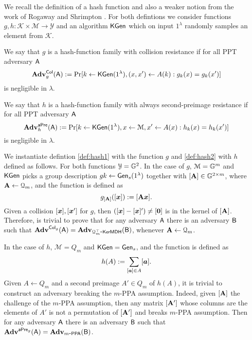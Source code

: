 We recall the definition of a hash function and also a weaker notion from the work of Rogaway and Shrimpton \cite{FSE:RogShr04}. For both defintions we consider functions $g,h:\mathcal{K}\times\mathcal{M}\to\mathcal{Y}$ and an algorithm $\mathsf{KGen}$ which on input $1^\lambda$ randomly samples an element from $\mathcal{K}$.

\begin{definition}\label{def:hash1}
 We say that $g$ is a hash-function family with collision resistance if for all PPT adversary $\mathsf{A}$
$$
\mathbf{Adv}_g^{\mathsf{Col}}(\mathsf{A}) := \Pr[k\gets\mathsf{KGen}(1^\lambda), (x,x')\gets A(k):g_k(x)=g_k(x')]
$$ 
is negligible in $\lambda$.
\end{definition}

\begin{definition}\label{def:hash2}
 We say that $h$ is a hash-function family with always second-preimage resistance if for all PPT adversary $\mathsf{A}$
$$
\mathbf{Adv}_h^{\mathsf{aPre}}(\mathsf{A}) := \Pr[k\gets\mathsf{KGen}(1^\lambda), x\gets\mathcal{M}, x'\gets A(x):h_k(x)=h_k(x')]
$$ 
is negligible in $\lambda$.
\end{definition}

We instantiate defintion \ref{def:hash1} with the function $g$ and \ref{def:hash2}  with $h$ defined as follows. For both functions $\mathcal{Y}=\mathbb{G}^2$. In the case of $g$, $\mathcal{M}=\mathbb{G}^m$ and $\mathsf{KGen}$ picks a group description $gk\gets\mathsf{Gen}_s(1^\lambda)$ together with $[\mathbf{{A}}]\in\mathbb{G}^{2\times m}$, where $\mathbf{{A}}\gets\mathcal{Q}_m$, and the function is defined as
$$
g_{[\mathbf{{A}}]}([{\boldsymbol{x}}]):= [\mathbf{{A}}{\boldsymbol{x}}].
$$
Given a collision $[{\boldsymbol{x}}],[{\boldsymbol{x}}']$ for $g$, then $([{\boldsymbol{x}}]-[{\boldsymbol{x}}]')\neq [{\boldsymbol{0}}]$ is in the kernel of $[\mathbf{{A}} ]$. Therefore, is trivial to prove that for any adversary $\mathsf{A}$ there is an adversary $\mathsf{B}$ such that $\mathbf{Adv}^{\mathsf{Col}_g}(\mathsf{A})=\mathbf{Adv}_{\mathcal{Q}_m^\top\mbox{-}\mathsf{KerMDH}}(\mathsf{B})$, whenever $\mathbf{{A}}\gets\mathcal{Q}_m$.

 In the case of $h$, $\mathcal{M}=Q_m$ and $\mathsf{KGen}=\mathsf{Gen}_s$, and the function is defined as
$$
h(A):= \sum_{[{\boldsymbol{a}}]\in A}[{\boldsymbol{a}}].
$$
Given $A\gets Q_m$ and a second preimage $A'\in Q_m$ of $h(A)$, it is trivial to construct an adversary breaking the $m$-PPA assumption. Indeed, given $[\mathbf{{A}}]$ the challenge of the $m$-PPA assumption, then any matrix $[\mathbf{{A}}']$ whose columns are the elements of $A'$ is not a permutation of $[\mathbf{{A}}']$ and breaks $m$-PPA assumption. Then for any adversary $\mathsf{A}$ there is an adversary $\mathsf{B}$ such that $\mathbf{Adv}^{\mathsf{aPre}_g}(\mathsf{A})=\mathbf{Adv}_{m\mbox{-}\mathsf{PPA}}(\mathsf{B})$.

